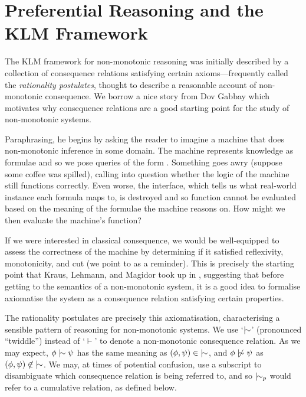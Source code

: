 \section{Preferential Reasoning and the KLM Framework}
\label{section:klm-framework}

The KLM framework for non-monotonic reasoning was initially described by a collection of consequence relations
satisfying certain axioms---frequently called the \textit{rationality postulates}, thought to describe a reasonable
account of non-monotonic consequence. We borrow a nice story from Dov Gabbay \cite{gabbay1985theoreticalFoundations} which
motivates why consequence relations are a good starting point for the study of non-monotonic systems.

Paraphrasing, he begins by asking the reader to imagine a machine that does non-monotonic inference in some domain. The machine
represents knowledge as formulae and so we pose queries of the form .
Something goes awry (suppose some coffee was spilled), calling into question whether the logic of the machine still
functions correctly. Even worse, the interface, which tells us what real-world instance each formula maps to, is
destroyed and so function cannot be evaluated based on the meaning of the formulae the machine reasons on. How might we then
evaluate the machine's function?

If we were interested in classical consequence, we would be well-equipped to assess the correctness of the machine by
determining if it satisfied reflexivity, monotonicity, and cut (we point to  as a
reminder). This is precisely the starting point that Kraus, Lehmann, and Magidor took up in \cite{kraus1990nonmonotonic},
suggesting that before getting to the semantics of a non-monotonic system, it is a good idea to formalise axiomatise the
system as a consequence relation satisfying certain properties.

The rationality postulates are precisely this axiomatisation, characterising a sensible pattern of reasoning for non-monotonic
systems. We use `$\twiddle$' (pronounced ``twiddle'') instead of `$\vdash$' to denote a non-monotonic consequence relation.
As we may expect, $\phi \twiddle \psi$ has the same meaning as $(\phi, \psi) \in \; \twiddle$, and $\phi \ntwiddle \psi$
as $(\phi, \psi)\not \in \; \twiddle$. We may, at times of potential confusion, use a subscript to disambiguate which consequence
relation is being referred to, and so $\twiddle_{p}$ would refer to a cumulative relation, as defined below.

